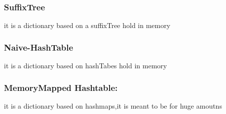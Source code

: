 \subsubsection{SuffixTree}  

it is a dictionary based on a suffixTree hold in memory

\subsubsection{Naive-HashTable}
  it is a dictionary based on hashTabes hold in memory
  
\subsubsection{MemoryMapped Hashtable:}it is a dictionary based on hashmaps,it is meant to be for huge amoutns

